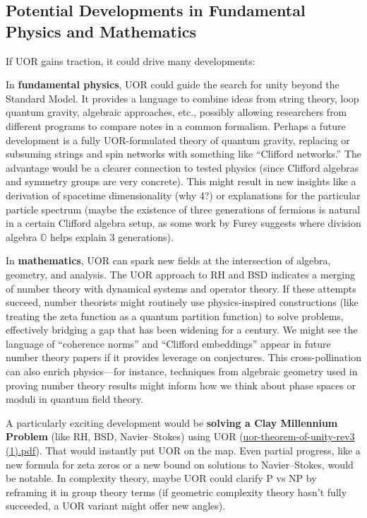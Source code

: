 \documentclass[12pt]{article}
\begin{document}
\subsection{Potential Developments in Fundamental Physics and Mathematics}

If UOR gains traction, it could drive many developments:

\medskip

In \textbf{fundamental physics}, UOR could guide the search for unity beyond the Standard Model. It provides a language to combine ideas from string theory, loop quantum gravity, algebraic approaches, etc., possibly allowing researchers from different programs to compare notes in a common formalism. Perhaps a future development is a fully UOR-formulated theory of quantum gravity, replacing or subsuming strings and spin networks with something like ``Clifford networks.'' The advantage would be a clearer connection to tested physics (since Clifford algebras and symmetry groups are very concrete). This might result in new insights like a derivation of spacetime dimensionality (why 4?) or explanations for the particular particle spectrum (maybe the existence of three generations of fermions is natural in a certain Clifford algebra setup, as some work by Furey suggests where division algebra $\mathbb{O}$ helps explain 3 generations).

\medskip

In \textbf{mathematics}, UOR can spark new fields at the intersection of algebra, geometry, and analysis. The UOR approach to RH and BSD indicates a merging of number theory with dynamical systems and operator theory. If these attempts succeed, number theorists might routinely use physics-inspired constructions (like treating the zeta function as a quantum partition function) to solve problems, effectively bridging a gap that has been widening for a century. We might see the language of ``coherence norms'' and ``Clifford embeddings'' appear in future number theory papers if it provides leverage on conjectures. This cross-pollination can also enrich physics---for instance, techniques from algebraic geometry used in proving number theory results might inform how we think about phase spaces or moduli in quantum field theory.

\medskip

A particularly exciting development would be \textbf{solving a Clay Millennium Problem} (like RH, BSD, Navier--Stokes) using UOR (\href{file://file-CJBWhjR1XERgfPCpnf5UAs#:~:text=Applications%20to%20the%20Riemann%20Hypothesis%2C,the%20scope%20of%20the%20method}{uor-theorem-of-unity-rev3 (1).pdf}). That would instantly put UOR on the map. Even partial progress, like a new formula for zeta zeros or a new bound on solutions to Navier--Stokes, would be notable. In complexity theory, maybe UOR could clarify P vs NP by reframing it in group theory terms (if geometric complexity theory hasn’t fully succeeded, a UOR variant might offer new angles).
\end{document}

